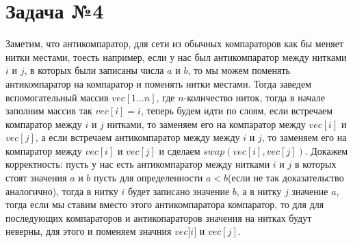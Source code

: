 \documentclass{article}
\begin{document}
\section{Задача №4}
Заметим, что антикомпаратор, для сети из обычных компараторов как бы меняет нитки местами, тоесть например, если у нас был антикомпаратор между нитками $i$ и $j$, в которых были записаны числа $a$ и $b$, то мы можем поменять антикомпаратор на компаратор и поменять нитки местами. Тогда заведем вспомогательный массив $vec[1...n]$, где $n$-количество ниток, тогда в начале заполним массив так $vec[i]=i$, теперь будем идти по слоям, если встречаем компаратор между $i$ и $j$ нитками, то заменяем его на компаратор между $vec[i]$ и $vec[j]$, а если встречаем антикомпаратор между между $i$ и $j$, то заменяем его на компаратор между $vec[i]$ и $vec[j]$ и сделаем $swap(vec[i], vec[j])$.\newline
Докажем корректность: пусть у нас есть антикомпаратор между нитками $i$ и $j$ в которых стоят значения $a$ и $b$ пусть для определенности $a<b$(если не так доказательство аналогично),	 тогда в нитку $i$ будет записано значение $b$, а в нитку $j$ значение $a$, тогда если мы ставим вместо этого антикомпаратора компаратор, то для для последующих компараторов и антикопараторов значения на нитках будут неверны, для этого и поменяем значния $vec]i]$ и $vec[j]$.
\end{document}
